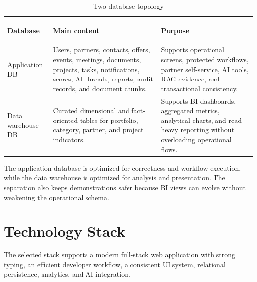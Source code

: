 \begin{table}[H]
  \centering
  \caption{Two-database topology}
  \begin{tabularx}{\textwidth}{>{\bfseries\raggedright\arraybackslash}p{3.2cm}>{\raggedright\arraybackslash}p{3.8cm}X}
    \toprule
    Database & Main content & Purpose \\
    \midrule
    Application DB & Users, partners, contacts, offers, events, meetings, documents, projects, tasks, notifications, scores, AI threads, reports, audit records, and document chunks. & Supports operational screens, protected workflows, partner self-service, AI tools, RAG evidence, and transactional consistency. \\
    Data warehouse DB & Curated dimensional and fact-oriented tables for portfolio, category, partner, and project indicators. & Supports BI dashboards, aggregated metrics, analytical charts, and read-heavy reporting without overloading operational flows. \\
    \bottomrule
  \end{tabularx}
\end{table}
The application database is optimized for correctness and workflow execution, while the data warehouse is optimized for analysis and presentation. The separation also keeps demonstrations safer because BI views can evolve without weakening the operational schema.
\section{Technology Stack}
The selected stack supports a modern full-stack web application with strong typing, an efficient developer workflow, a consistent UI system, relational persistence, analytics, and AI integration.

